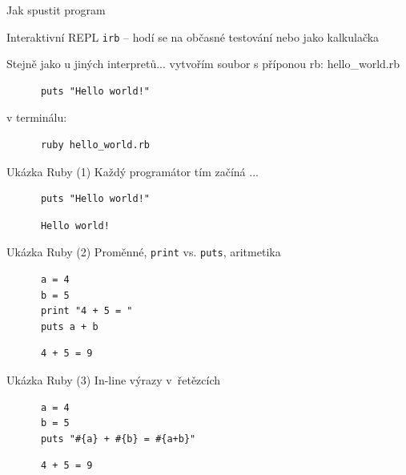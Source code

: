 \documentclass{beamer}
\begin{document}
\begin{frame}[fragile]{Jak spustit program}
  \begin{block}{Interaktivní REPL}
    \texttt{irb} -- hodí se na občasné testování nebo jako kalkulačka
  \end{block}
  \begin{block}{Stejně jako u jiných interpretů...}
    vytvořím soubor s příponou rb: hello\_world.rb
    \begin{verbatim}
      puts "Hello world!"
    \end{verbatim}
    v terminálu:
    \begin{verbatim}
      ruby hello_world.rb
    \end{verbatim}
  \end{block}
\end{frame}


\begin{frame}[fragile]{Ukázka Ruby (1)}
  Každý programátor tím začíná ...
  \begin{block}{}
    \smallskip \footnotesize
    {\scriptsize \begin{verbatim}
      puts "Hello world!"
    \end{verbatim}}
  \end{block}
  \pause
  \begin{block}{}
    \smallskip \footnotesize
    {\scriptsize \begin{verbatim}
      Hello world!
    \end{verbatim}}
  \end{block}
\end{frame}

\begin{frame}[fragile]{Ukázka Ruby (2)}
  Proměnné, \texttt{print} vs. \texttt{puts}, aritmetika
  \begin{block}{}
    \smallskip \footnotesize
    {\scriptsize \begin{verbatim}
      a = 4
      b = 5
      print "4 + 5 = "
      puts a + b
    \end{verbatim}}
  \end{block}
  \pause
  \begin{block}{}
    \smallskip \footnotesize
    {\scriptsize \begin{verbatim}
      4 + 5 = 9
    \end{verbatim}}
  \end{block}
\end{frame}

\begin{frame}[fragile]{Ukázka Ruby (3)}
  In-line výrazy v~řetězcích
  \begin{block}{}
    \smallskip \footnotesize
    {\scriptsize \begin{verbatim}
      a = 4
      b = 5
      puts "#{a} + #{b} = #{a+b}"
    \end{verbatim}}
  \end{block}
  \pause
  \begin{block}{}
    \smallskip \footnotesize
    {\scriptsize \begin{verbatim}
      4 + 5 = 9
    \end{verbatim}}
  \end{block}
\end{frame}
\end{document}
